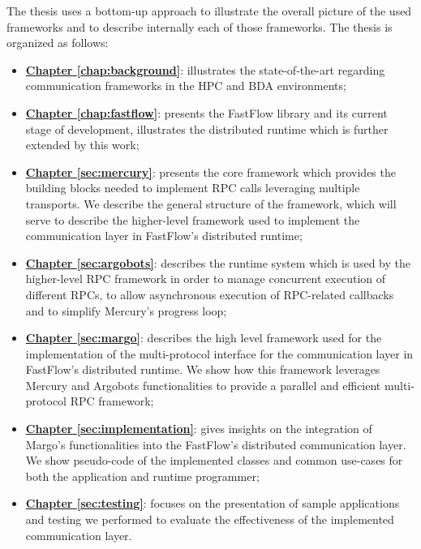 \documentclass[12pt, oneside]{report}
\newcommand{\hr}[2]{\hyperref[#1]{\textbf{#2 \ref{#1}}}}
\begin{document}
The thesis uses a bottom-up approach to illustrate the overall picture of the used frameworks and to describe internally each of those frameworks. The thesis is organized as follows:
\begin{itemize}
	\item \hr{chap:background}{Chapter}: illustrates the state-of-the-art regarding communication frameworks in the HPC and BDA environments;
	\item \hr{chap:fastflow}{Chapter}: presents the FastFlow library and its current stage of development, illustrates the distributed runtime which is further extended by this work;
    \item \hr{sec:mercury}{Chapter}: presents the core framework which provides the building blocks needed to implement RPC calls leveraging multiple transports. We describe the general structure of the framework, which will serve to describe the higher-level framework used to implement the communication layer in FastFlow's distributed runtime;
    \item \hr{sec:argobots}{Chapter}: describes the runtime system which is used by the higher-level RPC framework in order to manage concurrent execution of different RPCs, to allow asynchronous execution of RPC-related callbacks and to simplify Mercury's progress loop;
    \item \hr{sec:margo}{Chapter}: describes the high level framework used for the implementation of the multi-protocol interface for the communication layer in FastFlow's distributed runtime. We show how this framework leverages Mercury and Argobots functionalities to provide a parallel and efficient multi-protocol RPC framework;
    \item \hr{sec:implementation}{Chapter}: gives insights on the integration of Margo's functionalities into the FastFlow's distributed communication layer. We show pseudo-code of the implemented classes and common use-cases for both the application and runtime programmer;
    \item \hr{sec:testing}{Chapter}: focuses on the presentation of sample applications and testing we performed to evaluate the effectiveness of the implemented communication layer.
\end{itemize}








\newpage

\printbibliography
\newpage
% 
\end{document}
